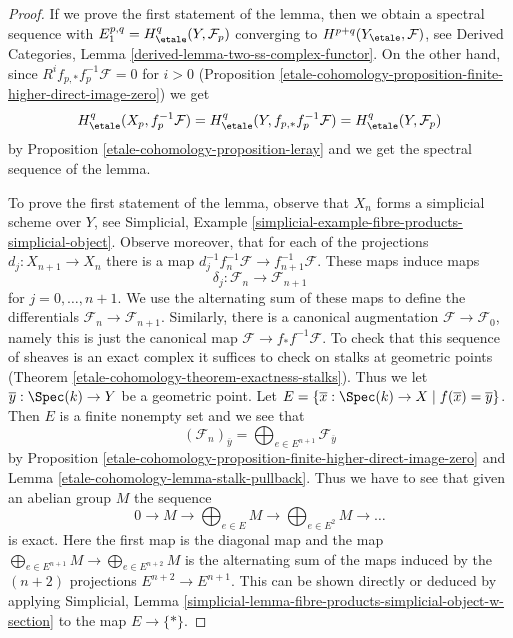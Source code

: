 \begin{proof}
If we prove the first statement of the lemma, then we obtain a spectral
sequence with $E_1^{p, q} = H^q_\etale(Y, \mathcal{F}_p)$ converging
to $H^{p + q}(Y_\etale, \mathcal{F})$, see
Derived Categories, Lemma \ref{derived-lemma-two-ss-complex-functor}.
On the other hand, since
$R^if_{p, *}f_p^{-1}\mathcal{F} = 0$ for $i > 0$
(Proposition \ref{etale-cohomology-proposition-finite-higher-direct-image-zero})
we get
$$
H^q_\etale(X_p, f_p^{-1}\mathcal{F}) =
H^q_\etale(Y, f_{p, *}f_p^{-1} \mathcal{F}) =
H^q_\etale(Y, \mathcal{F}_p)
$$
by Proposition \ref{etale-cohomology-proposition-leray}
and we get the spectral sequence of the lemma.

\medskip\noindent
To prove the first statement of the lemma, observe that
$X_n$ forms a simplicial scheme over $Y$, see
Simplicial, Example \ref{simplicial-example-fibre-products-simplicial-object}.
Observe moreover, that for each of the projections
$d_j : X_{n + 1} \to X_n$ there is a map
$d_j^{-1} f_n^{-1}\mathcal{F} \to f_{n + 1}^{-1}\mathcal{F}$.
These maps induce maps
$$
\delta_j : \mathcal{F}_n \to \mathcal{F}_{n + 1}
$$
for $j = 0, \ldots, n + 1$. We use the alternating sum of these maps
to define the differentials $\mathcal{F}_n \to \mathcal{F}_{n + 1}$.
Similarly, there is a canonical augmentation $\mathcal{F} \to \mathcal{F}_0$,
namely this is just the canonical map $\mathcal{F} \to f_*f^{-1}\mathcal{F}$.
To check that this sequence of sheaves is an exact complex it suffices
to check on stalks at geometric points (Theorem \ref{etale-cohomology-theorem-exactness-stalks}).
Thus we let $\overline{y} : \Spec(k) \to Y$ be a geometric point. Let
$E = \{\overline{x} : \Spec(k) \to X \mid f(\overline{x}) = \overline{y}\}$.
Then $E$ is a finite nonempty set and we see that
$$
(\mathcal{F}_n)_{\overline{y}} =
\bigoplus\nolimits_{e \in E^{n + 1}} \mathcal{F}_{\overline{y}}
$$
by Proposition \ref{etale-cohomology-proposition-finite-higher-direct-image-zero}
and Lemma \ref{etale-cohomology-lemma-stalk-pullback}.
Thus we have to see that given an abelian group $M$ the sequence
$$
0 \to M \to \bigoplus\nolimits_{e \in E} M \to
\bigoplus\nolimits_{e \in E^2} M \to \ldots
$$
is exact. Here the first map is the diagonal map and the map
$\bigoplus_{e \in E^{n + 1}} M  \to \bigoplus_{e \in E^{n + 2}} M$
is the alternating sum of the maps induced by the $(n + 2)$
projections $E^{n + 2} \to E^{n + 1}$. This can be shown directly
or deduced by applying Simplicial, Lemma
\ref{simplicial-lemma-fibre-products-simplicial-object-w-section}
to the map $E \to \{*\}$.
\end{proof}

